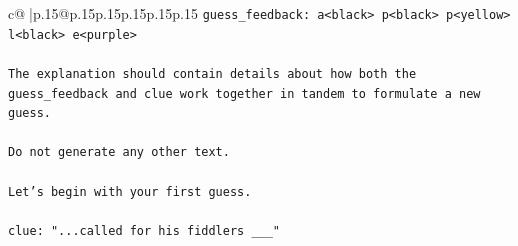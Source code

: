 \documentclass{article}
\begin{document}
{\begin{supertabular}{c@{$\;$}|p{.15\linewidth}@{}p{.15\linewidth}p{.15\linewidth}p{.15\linewidth}p{.15\linewidth}p{.15\linewidth}}
{{{\texttt{guess\_feedback: a<black> p<black> p<yellow> l<black> e<purple>} \\
\\ 
\texttt{The explanation should contain details about how both the guess\_feedback and clue work together in tandem to formulate a new guess.} \\
\\ 
\texttt{Do not generate any other text.} \\
\\ 
\texttt{Let's begin with your first guess.} \\
\\ 
\texttt{clue: "...called for his fiddlers \_\_\_"} \\
            }
        }
    }
     \\ \\


\end{supertabular}}
\end{document}
